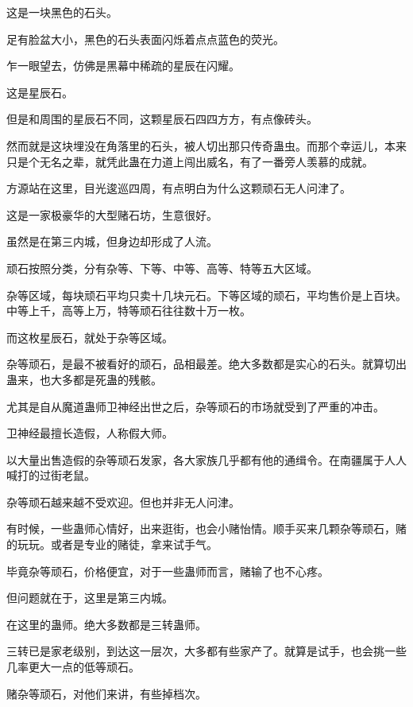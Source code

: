 
\begin{this_body}



这是一块黑色的石头。

足有脸盆大小，黑色的石头表面闪烁着点点蓝色的荧光。

乍一眼望去，仿佛是黑幕中稀疏的星辰在闪耀。

这是星辰石。

但是和周围的星辰石不同，这颗星辰石四四方方，有点像砖头。

然而就是这块埋没在角落里的石头，被人切出那只传奇蛊虫。而那个幸运儿，本来只是个无名之辈，就凭此蛊在力道上闯出威名，有了一番旁人羡慕的成就。

方源站在这里，目光逡巡四周，有点明白为什么这颗顽石无人问津了。

这是一家极豪华的大型赌石坊，生意很好。

虽然是在第三内城，但身边却形成了人流。

顽石按照分类，分有杂等、下等、中等、高等、特等五大区域。

杂等区域，每块顽石平均只卖十几块元石。下等区域的顽石，平均售价是上百块。中等上千，高等上万，特等顽石往往数十万一枚。

而这枚星辰石，就处于杂等区域。

杂等顽石，是最不被看好的顽石，品相最差。绝大多数都是实心的石头。就算切出蛊来，也大多都是死蛊的残骸。

尤其是自从魔道蛊师卫神经出世之后，杂等顽石的市场就受到了严重的冲击。

卫神经最擅长造假，人称假大师。

以大量出售造假的杂等顽石发家，各大家族几乎都有他的通缉令。在南疆属于人人喊打的过街老鼠。

杂等顽石越来越不受欢迎。但也并非无人问津。

有时候，一些蛊师心情好，出来逛街，也会小赌怡情。顺手买来几颗杂等顽石，赌的玩玩。或者是专业的赌徒，拿来试手气。

毕竟杂等顽石，价格便宜，对于一些蛊师而言，赌输了也不心疼。

但问题就在于，这里是第三内城。

在这里的蛊师。绝大多数都是三转蛊师。

三转已是家老级别，到达这一层次，大多都有些家产了。就算是试手，也会挑一些几率更大一点的低等顽石。

赌杂等顽石，对他们来讲，有些掉档次。


\end{this_body}
